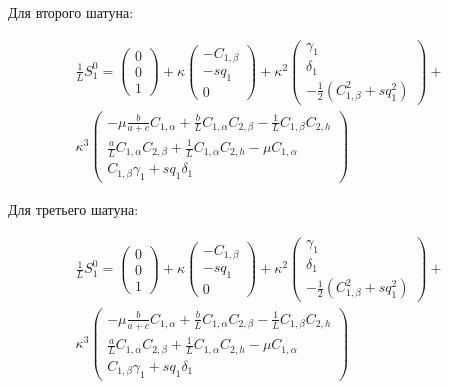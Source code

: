 Для второго шатуна:

\begin{equation}
\begin{aligned}
	\frac{1}{L}S_1^0 = \begin{pmatrix} 0 \\ 0 \\ 1\end{pmatrix} + \kappa\begin{pmatrix}-C_{1,\beta} \\ -sq_1 \\ 0 \end{pmatrix} + \kappa^2\begin{pmatrix}\gamma_1 \\ \delta_1 \\ -\frac{1}{2}\left(C^2_{1,\beta} + sq^2_1\right)\end{pmatrix} + \\ \kappa^3\begin{pmatrix}
	-\mu \frac{b}{a+c}C_{1,\alpha} + \frac{b}{L}C_{1,\alpha}C_{2,\beta} - \frac{1}{L}C_{1,\beta}C_{2,h}\\
	\frac{a}{L}C_{1,\alpha}C_{2,\beta} + \frac{1}{L}C_{1,\alpha}C_{2,h} - \mu C_{1,\alpha} \\
	C_{1,\beta}\gamma_1 + sq_1\delta_1
	\end{pmatrix}
\end{aligned}
\end{equation}

Для третьего шатуна:

\begin{equation}
\begin{aligned}
	\frac{1}{L}S_1^0 = \begin{pmatrix} 0 \\ 0 \\ 1\end{pmatrix} + \kappa\begin{pmatrix}-C_{1,\beta} \\ -sq_1 \\ 0 \end{pmatrix} + \kappa^2\begin{pmatrix}\gamma_1 \\ \delta_1 \\ -\frac{1}{2}\left(C^2_{1,\beta} + sq^2_1\right)\end{pmatrix} + \\ \kappa^3\begin{pmatrix}
	-\mu \frac{b}{a+c}C_{1,\alpha} + \frac{b}{L}C_{1,\alpha}C_{2,\beta} - \frac{1}{L}C_{1,\beta}C_{2,h}\\
	\frac{a}{L}C_{1,\alpha}C_{2,\beta} + \frac{1}{L}C_{1,\alpha}C_{2,h} - \mu C_{1,\alpha} \\
	C_{1,\beta}\gamma_1 + sq_1\delta_1
	\end{pmatrix}
\end{aligned}
\end{equation}

